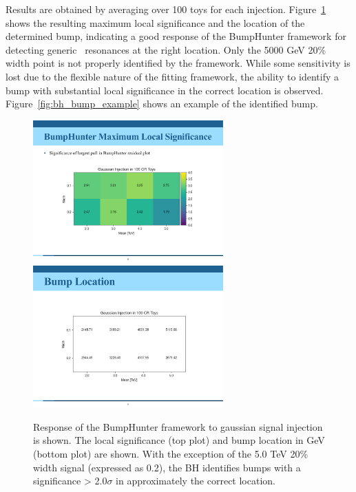 Results are obtained by averaging over 100 toys for each injection.
Figure~\ref{fig:siginj_bh} shows the resulting maximum local significance and the location of the determined bump, indicating a good response of the BumpHunter framework for detecting generic \mt~resonances at the right location.
Only the 5000 GeV 20\% width point is not properly identified by the framework. 
While some sensitivity is lost due to the flexible nature of the fitting framework, the ability to identify a bump with substantial local significance in the correct location is observed.
Figure~\ref{fig:bh_bump_example} shows an example of the identified bump.

\begin{figure}[!htbp]
\centering
   \includegraphics[width=0.65\textwidth]{figures/stats/siginj_bh_localsig.pdf}
   \includegraphics[width=0.65\textwidth]{figures/stats/siginj_bh_bumploc.pdf}
    \caption{Response of the BumpHunter framework to gaussian signal injection is shown. The local significance (top plot) and bump location in GeV (bottom plot) are shown. With the exception of the 5.0 TeV 20\% width signal (expressed as 0.2), the BH identifies bumps with a significance > 2.0$\sigma$ in approximately the correct location.
    \label{fig:siginj_bh}}
\end{figure}

